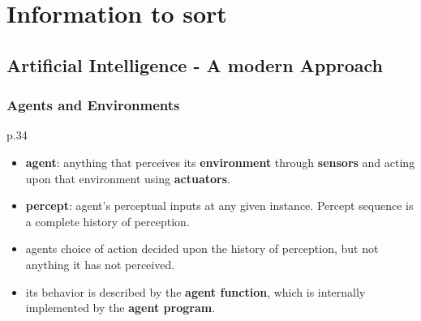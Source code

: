 
\chapter{Information to sort}
\label{ch:Info}

\section{Artificial Intelligence - A modern Approach}
\subsection{Agents and Environments}
p.34
\begin{itemize}[noitemsep,nolistsep]
	\item \textbf{agent}: anything that perceives its \textbf{environment} through \textbf{sensors} and acting upon that environment using \textbf{actuators}.
	\item \textbf{percept}: agent’s perceptual inputs at any given instance. Percept sequence is a complete history of perception.
	\item agents choice of action decided upon the history of perception, but not anything it has not perceived.
	\item its behavior is described by the \textbf{agent function}, which is internally implemented by the \textbf{agent program}.
\end{itemize}


